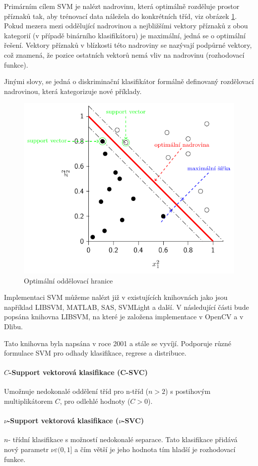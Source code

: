 Primárním cílem SVM je nalézt nadrovinu, která optimálně rozděluje prostor příznaků tak, aby trénovací data náležela do konkrétních tříd, viz obrázek \ref{fig:svm}. Pokud mezera mezi oddělující nadrovinou a nejbližšími vektory příznaků z obou kategorií (v případě binárního klasifikátoru) je maximální, jedná se o optimální řešení. Vektory příznaků v blízkosti této nadroviny se nazývají podpůrné vektory, což znamená, že pozice ostatních vektorů nemá vliv na nadrovinu (rozhodovací funkce). 

Jinými slovy, se jedná o diskriminační klasifikátor formálně definovaný rozdělovací nadrovinou, která kategorizuje nové příklady.
\begin{figure}[H]
\centering
\includegraphics[width=.7\linewidth]{figures/svm.pdf}
\caption{Optimální oddělovací hranice}
\label{fig:svm}
\end{figure}

Implementaci SVM můžeme nalézt již v existujících knihovnách jako jsou například LIBSVM, MATLAB, SAS, SVMLight a další. V následující části bude popsána knihovna LIBSVM, na které je založena implementace v OpenCV a v Dlibu.  

Tato knihovna byla napsána v roce 2001 \cite{libsvm} a stále se vyvíjí. Podporuje různé formulace SVM pro odhady klasifikace, regrese a distribuce.

\paragraph{$C$-Support vektorová klasifikace (C-SVC)}
Umožnuje nedokonalé oddělení tříd pro n-tříd ($n > 2$) s postihovým multiplikátorem $C$, pro odlehlé hodnoty ($C > 0$). \cite{csvmclass}

\paragraph{$\nu$-Support vektorová klasifikace ($\nu$-SVC)}
$n$- třídní klasifikace s možností nedokonalé separace. Tato klasifikace přidává nový parametr $\nu \varepsilon (0,1]$ a čím větší je jeho hodnota tím hladší je rozhodovací funkce. \cite{nusvmsvrclass}

